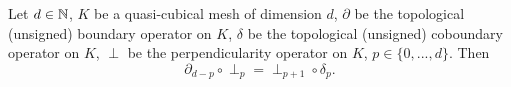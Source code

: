 \begin{proposition}
  Let
    $d \in \mathbb{N}$,
    $K$ be a quasi-cubical mesh of dimension $d$,
    $\partial$ be the topological (unsigned) boundary operator on $K$,
    $\delta$ be the topological (unsigned) coboundary operator on $K$,
    $\perp$ be the perpendicularity operator on $K$,
    $p \in \{0, ..., d\}$.
  Then
  \begin{equation}
    \partial_{d - p} \circ \perp_p = \perp_{p + 1} \circ \delta_p.
  \end{equation}
\end{proposition}

